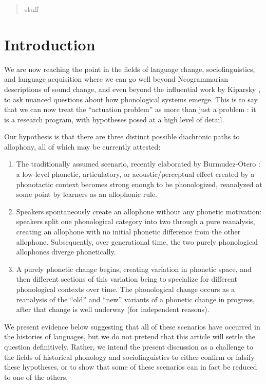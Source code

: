 \date{Received: date / Accepted: date}


\maketitle

\begin{abstract}
stuff
\end{abstract}

\section{Introduction}
\label{intro}

We are now reaching the point in the fields of language change, sociolinguistics, and language acquisition where we can go well beyond Neogrammarian descriptions of sound change, and even beyond the influential work by Kiparsky , to ask nuanced questions about how phonological systems emerge. This is to say that we can now treat the ``actuation problem'' as more than just a problem \citep{wlh1968}: it is a research program, with hypotheses posed at a high level of detail.

Our hypothesis is that there are three distinct possible diachronic paths to allophony, all of which may be currently attested:
\begin{enumerate}
    \item The traditionally assumed scenario, recently elaborated by Burmudez-Otero : a low-level phonetic, articulatory, or acoustic/perceptual effect created by a phonotactic context becomes strong enough to be phonologized, reanalyzed at some point by learners as an allophonic rule. 
    \item Speakers spontaneously create an allophone without any phonetic motivation: speakers split one phonological category into two through a pure reanalysis, creating an allophone with no initial phonetic difference from the other allophone. Subsequently, over generational time, the two purely phonological allophones diverge phonetically.
    \item A purely phonetic change begins, creating variation in phonetic space, and then different sections of this variation being to specialize for different phonological contexts over time. The phonological change occurs as a reanalysis of the ``old'' and ``new'' variants of a phonetic change in progress, after that change is well underway (for independent reasons). \\
\end{enumerate}
\noindent We present evidence below suggesting that all of these scenarios have occurred in the histories of languages, but we do not pretend that this article will settle the question definitively. Rather, we intend the present discussion as a challenge to the fields of historical phonology and sociolinguistics to either confirm or falsify these hypotheses, or to show that some of these scenarios can in fact be reduced to one of the others.

